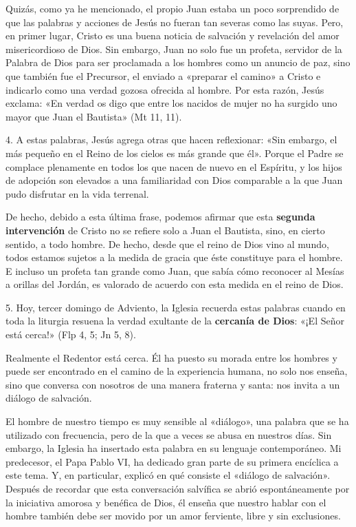 \documentclass[]{article}
\begin{document}
Quizás, como ya he mencionado, el propio Juan estaba un poco sorprendido
de que las palabras y acciones de Jesús no fueran tan severas como las
suyas. Pero, en primer lugar, Cristo es una buena noticia de salvación y
revelación del amor misericordioso de Dios. Sin embargo, Juan no solo
fue un profeta, servidor de la Palabra de Dios para ser proclamada a los
hombres como un anuncio de paz, sino que también fue el Precursor, el
enviado a «preparar el camino» a Cristo e indicarlo como una verdad
gozosa ofrecida al hombre. Por esta razón, Jesús exclama: «En verdad os
digo que entre los nacidos de mujer no ha surgido uno mayor que Juan el
Bautista» (Mt 11, 11).

4. A estas palabras, Jesús agrega otras que hacen reflexionar: «Sin
embargo, el más pequeño en el Reino de los cielos es más grande que él».
Porque el Padre se complace plenamente en todos los que nacen de nuevo
en el Espíritu, y los hijos de adopción son elevados a una familiaridad
con Dios comparable a la que Juan pudo disfrutar en la vida terrenal.

De hecho, debido a esta última frase, podemos afirmar que esta
\textbf{segunda intervención} de Cristo no se refiere solo a Juan el
Bautista, sino, en cierto sentido, a todo hombre. De hecho, desde que el
reino de Dios vino al mundo, todos estamos sujetos a la medida de gracia
que éste constituye para el hombre. E incluso un profeta tan grande como
Juan, que sabía cómo reconocer al Mesías a orillas del Jordán, es
valorado de acuerdo con esta medida en el reino de Dios.

5. Hoy, tercer domingo de Adviento, la Iglesia recuerda estas palabras
cuando en toda la liturgia resuena la verdad exultante de la
\textbf{cercanía de Dios}: «¡El Señor está cerca!» (Flp 4, 5; Jn 5, 8).

Realmente el Redentor está cerca. Él ha puesto su morada entre los
hombres y puede ser encontrado en el camino de la experiencia humana, no
solo nos enseña, sino que conversa con nosotros de una manera fraterna y
santa: nos invita a un diálogo de salvación.

El hombre de nuestro tiempo es muy sensible al «diálogo», una palabra
que se ha utilizado con frecuencia, pero de la que a veces se abusa en
nuestros días. Sin embargo, la Iglesia ha insertado esta palabra en su
lenguaje contemporáneo. Mi predecesor, el Papa Pablo VI, ha dedicado
gran parte de su primera encíclica a este tema. Y, en particular,
explicó en qué consiste el «diálogo de salvación». Después de recordar
que esta conversación salvífica se abrió espontáneamente por la
iniciativa amorosa y benéfica de Dios, él enseña que nuestro hablar con
el hombre también debe ser movido por un amor ferviente, libre y sin
exclusiones.
\end{document}
